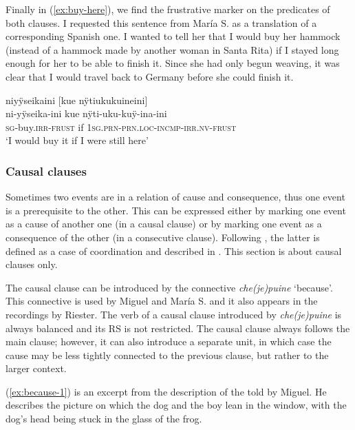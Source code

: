 Finally in (\ref{ex:buy-here}), we find the frustrative marker on the predicates of both clauses. I requested this sentence from María S. as a translation of a corresponding Spanish one. I wanted to tell her that I would buy her hammock (instead of a hammock made by another woman in Santa Rita) if I stayed long enough for her to be able to finish it. Since she had only begun weaving, it was clear that I would travel back to Germany before she could finish it.

\ea\label{ex:buy-here}
\begingl
\glpreamble niyÿseikaini \textup{[}kue nÿtiukukuineini\textup{]}\\
\gla ni-yÿseika-ini kue nÿti-uku-kuÿ-ina-ini\\
\textsc{sg}-buy.\textsc{irr}-\textsc{frust} if 1\textsc{sg.prn}-\textsc{prn.loc}-\textsc{incmp}-\textsc{irr.nv}-\textsc{frust}\\
\glft ‘I would buy it if I were still here’
\endgl
\trailingcitation{[rxx-e181022le]}
\xe
{}

\subsubsection{Causal clauses}\label{sec:CauseConsequence}

Sometimes two events are in a relation of cause and consequence, thus one event is a prerequisite to the other. This can be expressed either by marking one event as a cause of another one (in a causal clause) or by marking one event as a consequence of the other (in a consecutive clause). Following \citet[38]{Cristofaro2003}, the latter is defined as a case of coordination and described in . This section is about causal clauses only.

The causal clause can be introduced by the connective \textit{che(je)puine} ‘because’. This connective is used by Miguel and María S. and it also appears in the recordings by Riester. The verb of a causal clause introduced by \textit{che(je)puine} is always balanced and its RS is not restricted. The causal clause always follows the main clause; however, it can also introduce a separate  unit, in which case the cause may be less tightly connected to the previous clause, but rather to the larger context.


(\ref{ex:because-1}) is an excerpt from the description of the  told by Miguel. He describes the picture on which the dog and the boy lean in the window, with the dog’s head being stuck in the glass of the frog.

